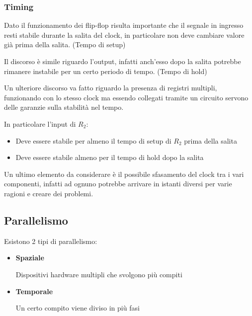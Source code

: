 \documentclass{article}
\begin{document}
\subsubsection{Timing}

Dato il funzionamento dei flip-flop risulta importante che il segnale in ingresso resti stabile durante la salita del clock, in particolare non deve cambiare valore già prima della salita. (Tempo di setup)\newline

Il discorso è simile riguardo l'output, infatti anch'esso dopo la salita potrebbe rimanere instabile per un certo periodo di tempo. (Tempo di hold)\newline

Un ulteriore discorso va fatto riguardo la presenza di registri multipli, funzionando con lo stesso clock ma essendo collegati tramite un circuito servono delle garanzie sulla stabilità nel tempo.\newline

In particolare l'input di $R_2$:
\begin{itemize}
    \item Deve essere stabile per almeno il tempo di setup di $R_2$ prima della salita
    \item Deve essere stabile almeno per il tempo di hold dopo la salita
\end{itemize}

Un ultimo elemento da considerare è il possibile sfasamento del clock tra i vari componenti, infatti ad ognuno potrebbe arrivare in istanti diversi per varie ragioni e creare dei problemi.

\subsection{Parallelismo}

Esistono 2 tipi di parallelismo:
\begin{itemize}
    \item \textbf{Spaziale}

        \quad Dispositivi hardware multipli che svolgono più compiti
        
    \item \textbf{Temporale}
    
        \quad Un certo compito viene diviso in più fasi 
        
\end{itemize}

\vspace{3pt}
\end{document}
